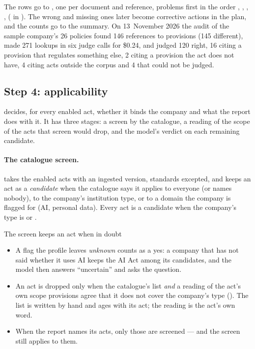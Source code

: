 The rows go to , one per document and reference, problems first in the
order , , , ,
 ( in ). The wrong and missing ones
later become corrective actions in the plan, and the counts go to the summary. On 13~November
2026 the audit of the sample company's 26 policies found 146 references to provisions (145
different), made 271 lookups in six judge calls for \$0.24, and judged 120 right, 16 citing a
provision that regulates something else, 2 citing a provision the act does not have, 4 citing
acts outside the corpus and 4 that could not be judged.

\subsection{Step 4: applicability}\label{sec:report:applicability}

 decides, for every enabled act, whether it binds the company and what
the report does with it. It has three stages: a screen by the catalogue, a reading of the scope
of the acts that screen would drop, and the model's verdict on each remaining candidate.

\paragraph{The catalogue screen.}  takes the enabled acts with an ingested
version, standards excepted, and keeps an act as a \emph{candidate} when the catalogue says it
applies to everyone (or names nobody), to the company's institution type, or to a domain the
company is flagged for (AI, personal data). Every act is a candidate when the company's type is
 or .

\begin{codebox}{The screen keeps an act when in doubt}
\begin{itemize}
  \item A flag the profile leaves \emph{unknown} counts as a yes: a company that has not said
    whether it uses AI keeps the AI Act among its candidates, and the model then answers
    \enquote{uncertain} and asks the question.
  \item An act is dropped only when the catalogue's list \emph{and} a reading of the act's own
    scope provisions agree that it does not cover the company's type (). The
    list is written by hand and ages with its act; the reading is the act's own word.
  \item When the report names its acts, only those are screened --- and the screen still
    applies to them.
\end{itemize}
\end{codebox}

